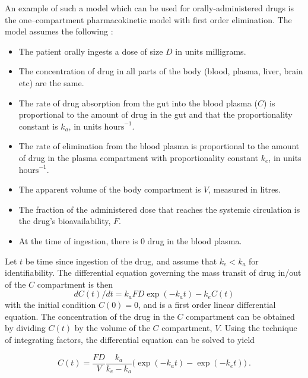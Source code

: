 An example of such a model which can be used for orally-administered drugs is the one--compartment pharmacokinetic model with first order elimination.  The model assumes the following \cite{wakefield1992bayesian}:  
%
\begin{itemize}
	
\item The patient orally ingests a dose of size $D$ in units milligrams.

\item The concentration of drug in all parts of the body (blood, plasma, liver, brain etc) are the same.

\item The rate of drug absorption from the gut  into the blood plasma ($ C $) is proportional to the amount of drug in the gut and that the proportionality constant is $ k_a $, in units $ \text{hours}^{-1} $.

\item The rate of elimination from the blood plasma is proportional to the amount of drug in the plasma compartment with proportionality constant $ k_e $, in units $ \text{hours}^{-1} $.

\item The apparent volume of the body compartment is $V$, measured in litres.

\item The fraction of the administered dose that reaches the systemic circulation is the drug’s bioavailability, $F$.

\item At the time of ingestion, there is 0 drug in the blood plasma.
\end{itemize}

Let $t$ be time since ingestion of the drug, and assume that $k_e < k_a$ for identifiability.  The differential equation governing the mass transit of drug in/out of the $C$ compartment is then 
\begin{equation}  \label{pkpd_ode}
dC(t)/dt = k_aFD\exp(-k_a t) - k_eC(t) 
\end{equation}
\noindent with the initial condition $C(0) = 0$, and is a first order linear differential equation.  The concentration of the drug in the $C$ compartment can be obtained by dividing $C(t)$ by the volume of the $C$ compartment, $V$.  Using the technique of integrating factors, the differential equation can be solved to yield

\begin{equation}\label{onecompartment_PKPD_model}
	C(t) = \dfrac{F D}{V}\dfrac{k_a}{k_e - k_a}\Big(\exp(-k_at) - \exp(-k_et)\Big) \>.
\end{equation}

